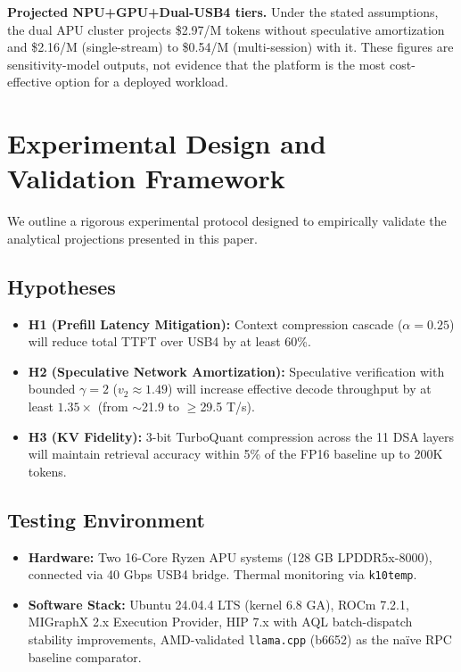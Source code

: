 \documentclass[11pt,a4paper]{article}
\begin{document}
\textbf{Projected NPU+GPU+Dual-USB4 tiers.} Under the stated assumptions, the dual APU cluster projects \$2.97/M tokens without speculative amortization and \$2.16/M (single-stream) to \$0.54/M (multi-session) with it. These figures are sensitivity-model outputs, not evidence that the platform is the most cost-effective option for a deployed workload.

\section{Experimental Design and Validation Framework}
\label{sec:validation}

We outline a rigorous experimental protocol designed to empirically validate the analytical projections presented in this paper.

\subsection{Hypotheses}
\begin{itemize}
    \item \textbf{H1 (Prefill Latency Mitigation):} Context compression cascade ($\alpha = 0.25$) will reduce total TTFT over USB4 by at least 60\%.
    \item \textbf{H2 (Speculative Network Amortization):} Speculative verification with bounded $\gamma=2$ ($v_2 \approx 1.49$) will increase effective decode throughput by at least $1.35\times$ (from $\sim$21.9 to $\ge$29.5 T/s).
    \item \textbf{H3 (KV Fidelity):} 3-bit TurboQuant compression across the 11 DSA layers will maintain retrieval accuracy within 5\% of the FP16 baseline up to 200K tokens.
\end{itemize}

\subsection{Testing Environment}
\begin{itemize}
    \item \textbf{Hardware:} Two 16-Core Ryzen APU systems (128 GB LPDDR5x-8000), connected via 40 Gbps USB4 bridge. Thermal monitoring via \texttt{k10temp}.
    \item \textbf{Software Stack:} Ubuntu 24.04.4 LTS (kernel 6.8 GA), ROCm 7.2.1, MIGraphX 2.x Execution Provider, HIP 7.x with AQL batch-dispatch stability improvements, AMD-validated \texttt{llama.cpp} (b6652) as the na\"ive RPC baseline comparator.
\end{itemize}
\end{document}
